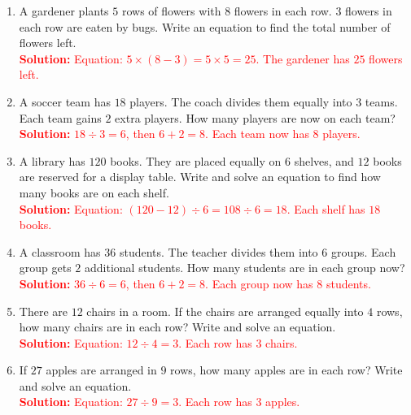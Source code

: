\documentclass[11pt]{article}
\begin{document}
\begin{tcolorbox}[colframe=black!60, colback=white, 
coltitle=black, colbacktitle=black!15, fonttitle=\bfseries\Large, 
title=Problems, halign title=center, left=10pt, right=10pt, top=10pt, bottom=60pt]
\begin{enumerate}[start=11, itemsep=3em]
    \item A gardener plants \(5\) rows of flowers with \(8\) flowers in each row. \(3\) flowers in each row are eaten by bugs. Write an equation to find the total number of flowers left.\\
    \textcolor{red}{\textbf{Solution:} Equation: \(5 \times (8 - 3) = 5 \times 5 = 25\). The gardener has \(25\) flowers left.}

    \item A soccer team has \(18\) players. The coach divides them equally into \(3\) teams. Each team gains \(2\) extra players. How many players are now on each team?\\
    \textcolor{red}{\textbf{Solution:} \(18 \div 3 = 6\), then \(6 + 2 = 8\). Each team now has \(8\) players.}

    \item A library has \(120\) books. They are placed equally on \(6\) shelves, and \(12\) books are reserved for a display table. Write and solve an equation to find how many books are on each shelf.\\
    \textcolor{red}{\textbf{Solution:} Equation: \((120 - 12) \div 6 = 108 \div 6 = 18\). Each shelf has \(18\) books.}

    \item A classroom has \(36\) students. The teacher divides them into \(6\) groups. Each group gets \(2\) additional students. How many students are in each group now?\\
    \textcolor{red}{\textbf{Solution:} \(36 \div 6 = 6\), then \(6 + 2 = 8\). Each group now has \(8\) students.}

    \item There are \(12\) chairs in a room. If the chairs are arranged equally into \(4\) rows, how many chairs are in each row? Write and solve an equation.\\
    \textcolor{red}{\textbf{Solution:} Equation: \(12 \div 4 = 3\). Each row has \(3\) chairs.}

    \item If \(27\) apples are arranged in \(9\) rows, how many apples are in each row? Write and solve an equation.\\
    \textcolor{red}{\textbf{Solution:} Equation: \(27 \div 9 = 3\). Each row has \(3\) apples.}
\end{enumerate}
\end{tcolorbox}
\end{document}
